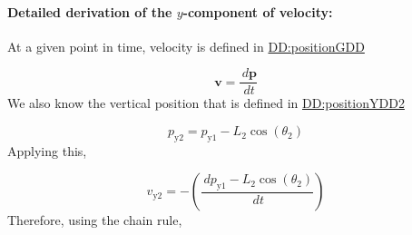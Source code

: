 \documentclass[12pt]{article}
\begin{document}
\paragraph{Detailed derivation of the $y$-component of velocity:}
\label{GD:velocityY2Deriv}
At a given point in time, velocity is defined in \hyperref[DD:positionGDD]{DD:positionGDD}

\begin{displaymath}
\symbf{v}=\frac{\,d\symbf{p}}{\,dt}
\end{displaymath}
We also know the vertical position that is defined in \hyperref[DD:positionYDD2]{DD:positionYDD2}

\begin{displaymath}
{p_{\text{y}2}}={p_{\text{y}1}}-{L_{2}} \cos\left({θ_{2}}\right)
\end{displaymath}
Applying this,

\begin{displaymath}
{v_{\text{y}2}}=-\left(\frac{\,d{p_{\text{y}1}}-{L_{2}} \cos\left({θ_{2}}\right)}{\,dt}\right)
\end{displaymath}
Therefore, using the chain rule,
\end{document}
